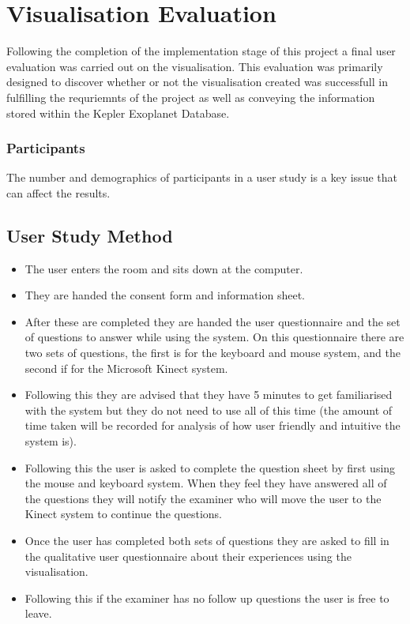 \chapter{Visualisation Evaluation}\label{C:sd}
Following the completion of the implementation stage of this project a final
user evaluation was carried out on the visualisation. This evaluation was
primarily designed to discover whether or not the visualisation created was
successfull in fulfilling the requriemnts of the project as well as conveying
the information stored within the Kepler Exoplanet Database.

\subsection{Participants}
The number and demographics of participants in a user study is a key issue that
can affect the results. ~

\section{User Study Method}
\begin{itemize}
\item The user enters the room and sits down at the computer.
\item They are handed the consent form and information sheet.
\item After these are completed they are handed the user questionnaire and the
set of questions to answer while using the system. On this questionnaire there
are two sets of questions, the first is for the keyboard and mouse system, and
the second if for the Microsoft Kinect system.
\item Following this they are advised that they have 5 minutes to get
familiarised with the system but they do not need to use all of this time (the
amount of time taken will be recorded for analysis of how user friendly and
intuitive the system is).
\item Following this the user is asked to complete the question sheet by first
using the mouse and keyboard system. When they feel they have answered all of
the questions they will notify the examiner who will move the user to the Kinect
system to continue the questions.
\item Once the user has completed both sets of questions they are asked to fill
in the qualitative user questionnaire about their experiences using the
visualisation. 
\item Following this if the examiner has no follow up questions the user is free
to leave.
\end{itemize}
